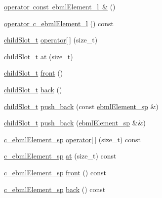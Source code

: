 \begin{DoxyCompactItemize}
\item 
\mbox{\hyperlink{classebml_1_1slot__t_ad350289e207fb6f5125b849d1174bb80}{operator const ebml\+Element\+\_\+l \&}} ()
\item 
\mbox{\hyperlink{classebml_1_1slot__t_abee3be5508e39066bd27923d9c138483}{operator c\+\_\+ebml\+Element\+\_\+l}} () const
\item 
\mbox{\hyperlink{classebml_1_1childSlot__t}{child\+Slot\+\_\+t}} \mbox{\hyperlink{classebml_1_1slot__t_a734f8cf3993a309a557557aca1cd6be8}{operator\mbox{[}$\,$\mbox{]}}} (size\+\_\+t)
\item 
\mbox{\hyperlink{classebml_1_1childSlot__t}{child\+Slot\+\_\+t}} \mbox{\hyperlink{classebml_1_1slot__t_abfa9697fbfa05ad723314497bdc7c299}{at}} (size\+\_\+t)
\item 
\mbox{\hyperlink{classebml_1_1childSlot__t}{child\+Slot\+\_\+t}} \mbox{\hyperlink{classebml_1_1slot__t_ad12308e65302012bfe30509c40e76174}{front}} ()
\item 
\mbox{\hyperlink{classebml_1_1childSlot__t}{child\+Slot\+\_\+t}} \mbox{\hyperlink{classebml_1_1slot__t_adc0fab024b3dd1a22e1ac27081ed1677}{back}} ()
\item 
\mbox{\hyperlink{classebml_1_1childSlot__t}{child\+Slot\+\_\+t}} \mbox{\hyperlink{classebml_1_1slot__t_acdbb11a14ce186aff8ebb95b98296afb}{push\+\_\+back}} (const \mbox{\hyperlink{namespaceebml_adad533b7705a16bb360fe56380c5e7be}{ebml\+Element\+\_\+sp}} \&)
\item 
\mbox{\hyperlink{classebml_1_1childSlot__t}{child\+Slot\+\_\+t}} \mbox{\hyperlink{classebml_1_1slot__t_acdfefb7ae413147ae5904d59d888d52d}{push\+\_\+back}} (\mbox{\hyperlink{namespaceebml_adad533b7705a16bb360fe56380c5e7be}{ebml\+Element\+\_\+sp}} \&\&)
\item 
\mbox{\hyperlink{namespaceebml_a2deef4e8071531b32e3533f1bf978917}{c\+\_\+ebml\+Element\+\_\+sp}} \mbox{\hyperlink{classebml_1_1slot__t_a553f97004880e160551be68ab05c33ce}{operator\mbox{[}$\,$\mbox{]}}} (size\+\_\+t) const
\item 
\mbox{\hyperlink{namespaceebml_a2deef4e8071531b32e3533f1bf978917}{c\+\_\+ebml\+Element\+\_\+sp}} \mbox{\hyperlink{classebml_1_1slot__t_acf1d704eae91fc410487421b80988f57}{at}} (size\+\_\+t) const
\item 
\mbox{\hyperlink{namespaceebml_a2deef4e8071531b32e3533f1bf978917}{c\+\_\+ebml\+Element\+\_\+sp}} \mbox{\hyperlink{classebml_1_1slot__t_ae7817a18a552f1399251c077dc6b65ad}{front}} () const
\item 
\mbox{\hyperlink{namespaceebml_a2deef4e8071531b32e3533f1bf978917}{c\+\_\+ebml\+Element\+\_\+sp}} \mbox{\hyperlink{classebml_1_1slot__t_ae9b2a7d37d5f8d71e97e973c9c708899}{back}} () const

\end{DoxyCompactItemize}

